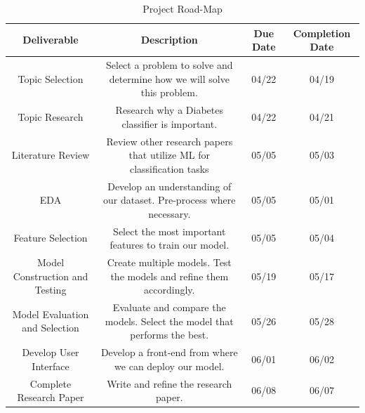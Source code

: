 \documentclass[conference]{IEEEtran}
\begin{document}
    \begin{table}[t]
        \centering
        \begin{tabular}{| c | c | c | c |}
            \toprule
            \textbf{Deliverable} & \textbf{Description} & \textbf{Due Date} & \textbf{Completion Date} \\ 
            \midrule
            Topic Selection & Select a problem to solve and determine how we will solve this problem. & 04/22 & 04/19 \\
            \midrule
            Topic Research & Research why a Diabetes classifier is important. & 04/22 & 04/21 \\
            \midrule
            Literature Review & Review other research papers that utilize ML for classification tasks & 05/05 & 05/03 \\
            \midrule
            EDA & Develop an understanding of our dataset. Pre-process where necessary. & 05/05 & 05/01 \\
            \midrule
            Feature Selection & Select the most important features to train our model. & 05/05 & 05/04 \\
            \midrule
            Model Construction and Testing & Create multiple models. Test the models and refine them accordingly. & 05/19 & 05/17 \\
            \midrule
            Model Evaluation and Selection & Evaluate and compare the models. Select the model that performs the best. & 05/26 & 05/28 \\
            \midrule
            Develop User Interface & Develop a front-end from where we can deploy our model. & 06/01 & 06/02 \\
            \midrule
            Complete Research Paper & Write and refine the research paper. & 06/08 & 06/07 \\
            \bottomrule
        \end{tabular}
        \vspace{0.2cm}
        \caption{Project Road-Map}
        \label{tab:roadmap}
    \end{table}
\end{document}
